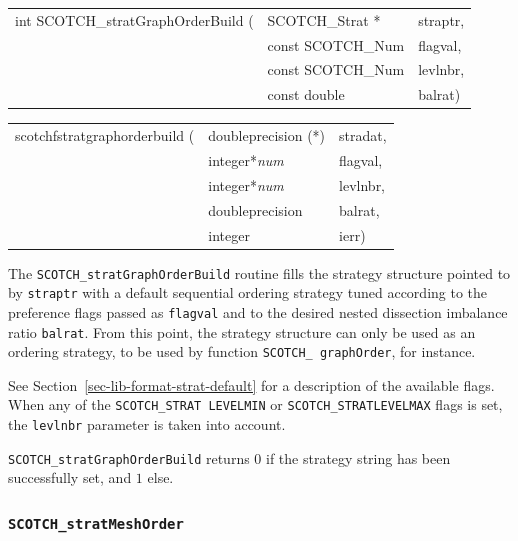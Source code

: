 \begin{itemize}
\progsyn

{\tt\begin{tabular}{l@{}ll}
int SCOTCH\_stratGraphOrderBuild ( & SCOTCH\_Strat *   & straptr, \\
                                   & const SCOTCH\_Num & flagval, \\
                                   & const SCOTCH\_Num & levlnbr, \\
                                   & const double      & balrat)
\end{tabular}}

{\tt\begin{tabular}{l@{}ll}
scotchfstratgraphorderbuild ( & doubleprecision (*) & stradat, \\
                              & integer*{\it num}   & flagval, \\
                              & integer*{\it num}   & levlnbr, \\
                              & doubleprecision     & balrat,  \\
                              & integer             & ierr)
\end{tabular}}

\progdes

The {\tt SCOTCH\_stratGraphOrderBuild} routine fills the strategy
structure pointed to by {\tt straptr} with a default sequential
ordering strategy tuned according to the preference flags passed as
{\tt flagval} and to the desired nested dissection imbalance ratio
{\tt balrat}. From this point, the strategy structure can only be used
as an ordering strategy, to be used by function {\tt SCOTCH\_\lbt
graph\lbt Order}, for instance.

See Section~\ref{sec-lib-format-strat-default} for a description of
the available flags. When any of the {\tt SCOTCH\_\lbt STRAT\lbt
LEVEL\lbt MIN} or {\tt SCOTCH\_\lbt STRAT\lbt LEVEL\lbt MAX} flags is
set, the {\tt levlnbr} parameter is taken into account.

\progret

{\tt SCOTCH\_stratGraphOrderBuild} returns $0$ if the strategy string
has been successfully set, and $1$ else.
\end{itemize}

\subsubsection{{\tt SCOTCH\_stratMeshOrder}}

